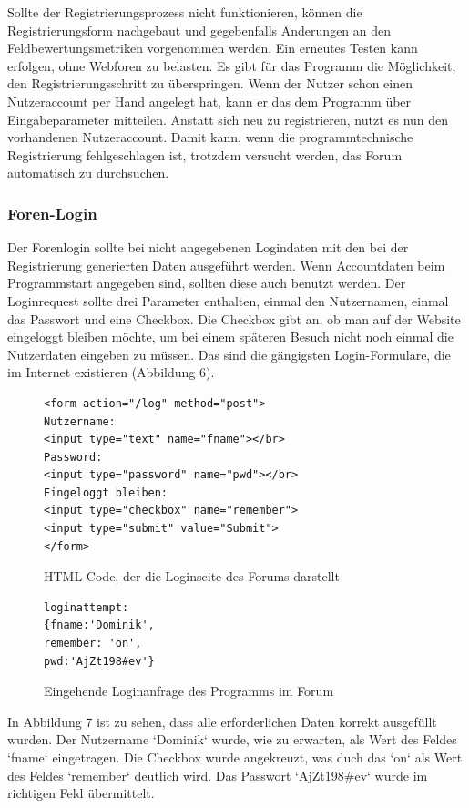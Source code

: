 Sollte der Registrierungsprozess nicht funktionieren, können die Registrierungsform nachgebaut und gegebenfalls Änderungen an den Feldbewertungsmetriken vorgenommen werden. Ein erneutes Testen kann erfolgen, ohne Webforen zu belasten. Es gibt für das Programm die Möglichkeit, den Registrierungsschritt zu überspringen. Wenn der Nutzer schon einen Nutzeraccount per Hand angelegt hat, kann er das dem Programm über Eingabeparameter mitteilen. Anstatt sich neu zu registrieren, nutzt es nun den vorhandenen Nutzeraccount. Damit kann, wenn die programmtechnische Registrierung fehlgeschlagen ist, trotzdem versucht werden, das Forum automatisch zu durchsuchen.

\subsubsection{Foren-Login}
Der Forenlogin sollte bei nicht angegebenen Logindaten mit den bei der Registrierung generierten Daten ausgeführt werden. Wenn Accountdaten beim Programmstart angegeben sind, sollten diese auch benutzt werden. Der Loginrequest sollte drei Parameter enthalten, einmal den Nutzernamen, einmal das Passwort und eine Checkbox. Die Checkbox gibt an, ob man auf der Website eingeloggt bleiben möchte, um bei einem späteren Besuch nicht noch einmal die Nutzerdaten eingeben zu müssen. Das sind die gängigsten Login-Formulare, die im Internet existieren (Abbildung 6).

\begin{figure}[ht]
\begin{lstlisting}[language=HTML5]
<form action="/log" method="post">
Nutzername: 
<input type="text" name="fname"></br>
Password: 
<input type="password" name="pwd"></br>
Eingeloggt bleiben: 
<input type="checkbox" name="remember">
<input type="submit" value="Submit">
</form>
\end{lstlisting}
\caption{HTML-Code, der die Loginseite des Forums darstellt}
\end{figure}


\begin{figure}[h!]
\begin{lstlisting}[language=HTML5]
loginattempt: 
{fname:'Dominik',
remember: 'on',
pwd:'AjZt198#ev'}
\end{lstlisting}
\caption{Eingehende Loginanfrage des Programms im Forum}
\end{figure}

In Abbildung 7 ist zu sehen, dass alle erforderlichen Daten korrekt ausgefüllt wurden. Der Nutzername `Dominik` wurde, wie zu erwarten, als Wert des Feldes `fname` eingetragen. Die Checkbox wurde angekreuzt, was duch das `on` als Wert des Feldes `remember` deutlich wird. Das Passwort `AjZt198\#ev` wurde im richtigen Feld übermittelt.

